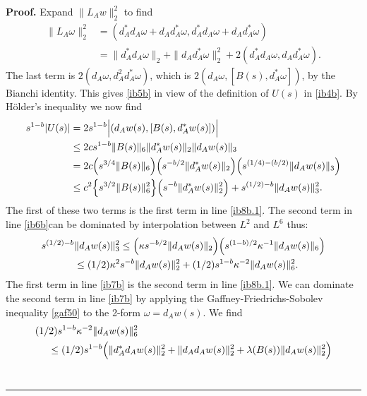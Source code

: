 \documentclass[12pt]{article}
\newenvironment{proof}[1][Proof]{\textbf{#1.} }{\ \rule{0.5em}{0.5em}}
\def \w{\omega}
\def \eref{\eqref}
\numberwithin{equation}{section}
\begin{document}
         \begin{proof} Expand $\| L_A w\|_2^2$ to find
\begin{align*}
\| L_A \w \|_2^2 &= (d_A^* d_A \w + d_A d_A^* \w,  d_A^* d_A \w + d_A d_A^* \w) \\
&=  \|d_A^* d_A \w\|_2 +   \|d_A d_A^* \w\|_2^2 + 2(d_A^*d_A\w, d_Ad_A^* \w).
\end{align*}
The last term is $2(d_A \w, d_A^2 d_A^*\w)$, which is $2(d_A \w, [B(s),d_A^*\w])$, by the Bianchi identity. 
This gives   \eref{ib5b} in view of the definition of $U(s)$ in \eref{ib4b}. 
By H\"older's inequality we now find
 \begin{align}
 s^{1-b} |U(s)| 
      &=2s^{1-b}  \Big|( d_A w(s), [ B(s), d_A^* w(s)])\Big|  \notag\\
    & \le  2cs^{1-b} \| B(s)\|_6 \|d_A^* w(s)\|_2 \|d_A w(s)\|_3             \notag \\
    &= 2c \Big(s^{3/4} \| B(s)\|_6\Big) \Big(s^{-b/2} \|d_A^* w(s)\|_2 \Big) 
    \Big(s^{(1/4) - (b/2)} \|d_A w(s)\|_3\Big)                         \notag\\
    &\le     c^2 \Big\{s^{3/2}\| B(s)\|_6^2\Big\} \Big( s^{-b} \|d_A^* w(s)\|_2^2\Big)  
                   +  s^{(1/2) - b}\|d_A w(s)\|_3 ^2.     \label{ib6b}
    \end{align}
  The first of these two terms is the first term in line \eref{ib8b.1}. The second term in line
   \eref{ib6b}can be dominated  by interpolation  between $L^2$ and $L^6$ thus:
    \begin{align}
   s^{(1/2) - b}& \| d_A w(s)\|_3^2 
   \le  \Big(\kappa s^{-b/2} \| d_Aw(s)\|_2\Big) 
                          \Big(s^{(1-b)/2} \kappa^{-1}\| d_A w(s)\|_6\Big)                    \notag \\
    &\le (1/2) \kappa^2 s^{-b} \| d_A w(s)\|_2^2 
                         + (1/2) s^{1-b} \kappa^{-2} \| d_A w(s)\|_6^2.                     \label{ib7b}
    \end{align}
    The first term in line \eref{ib7b} is the second term in line \eref{ib8b.1}. 
We can dominate the second term in line \eref{ib7b} by applying the
 Gaffney-Friedrichs-Sobolev inequality \eref{gaf50}
to the 2-form $\w = d_Aw(s)$.
We find
\begin{align*}
& (1/2)s^{1-b} \kappa^{-2}\| d_A w(s) \|_6^2   \notag\\
&\ \ \ \ \le (1/2)s^{1-b} \Big(\| d_A^* d_A w(s)\|_2^2    +  \| d_A d_A w(s)\|_2^2  
+ \lambda(B(s)) \| d_A w(s) \|_2^2\Big)                            \notag\\ 

\end{align*}
\end{proof}
\end{document}
